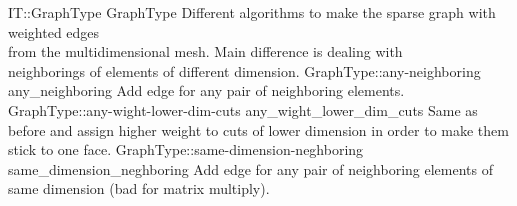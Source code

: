\begin{SelectionType}
	{IT::GraphType}
	{GraphType}
	{{{Different algorithms to make the sparse graph with weighted edges}\\{
from the multidimensional mesh. Main difference is dealing with }\\{
neighborings of elements of different dimension.}}}
		\SelectionItem
			{GraphType::any-neighboring}
			{any{\_}neighboring}
			{{{Add edge for any pair of neighboring elements.}}}
		\SelectionItem
			{GraphType::any-wight-lower-dim-cuts}
			{any{\_}wight{\_}lower{\_}dim{\_}cuts}
			{{{Same as before and assign higher weight to cuts of lower dimension in order to make them stick to one face.}}}
		\SelectionItem
			{GraphType::same-dimension-neghboring}
			{same{\_}dimension{\_}neghboring}
			{{{Add edge for any pair of neighboring elements of same dimension (bad for matrix multiply).}}}
\end{SelectionType}
